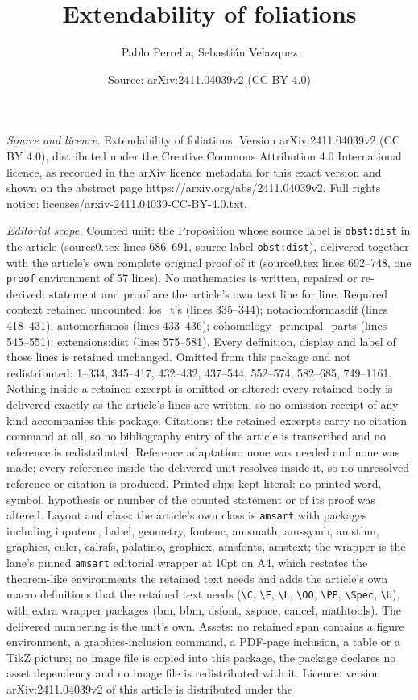 \documentclass[10pt,a4paper]{amsart}
\title[Extendability of foliations]{Extendability of foliations}
\author{Pablo Perrella, Sebasti\'an Velazquez}
\date{Source: arXiv:2411.04039v2 (CC BY 4.0)}
\begin{document}
\maketitle

\noindent\emph{Source and licence.} Extendability of foliations. Version arXiv:2411.04039v2 (CC BY 4.0), distributed under the Creative Commons Attribution 4.0 International licence, as recorded in the arXiv licence metadata for this exact version and shown on the abstract page https://arxiv.org/abs/2411.04039v2. Full rights notice: licenses/arxiv-2411.04039-CC-BY-4.0.txt.\par\smallskip

\noindent\textit{Editorial scope.} Counted unit: the Proposition whose source label is \texttt{obst:dist} in the article (source0.tex lines 686--691, source label \texttt{obst:dist}), delivered together with the article's own complete original proof of it (source0.tex lines 692--748, one \texttt{proof} environment of 57 lines). No mathematics is written, repaired or re-derived: statement and proof are the article's own text line for line. Required context retained uncounted: los\_t's (lines 335--344); notacion:formasdif (lines 418--431); automorfismos (lines 433--436); cohomology\_principal\_parts (lines 545--551); extensions:dist (lines 575--581). Every definition, display and label of those lines is retained unchanged. Omitted from this package and not redistributed: 1--334, 345--417, 432--432, 437--544, 552--574, 582--685, 749--1161. Nothing inside a retained excerpt is omitted or altered: every retained body is delivered exactly as the article's lines are written, so no omission receipt of any kind accompanies this package. Citations: the retained excerpts carry no citation command at all, so no bibliography entry of the article is transcribed and no reference is redistributed. Reference adaptation: none was needed and none was made; every reference inside the delivered unit resolves inside it, so no unresolved reference or citation is produced. Printed slips kept literal: no printed word, symbol, hypothesis or number of the counted statement or of its proof was altered. Layout and class: the article's own class is \texttt{amsart} with packages including inputenc, babel, geometry, fontenc, amsmath, amssymb, amsthm, graphics, euler, calrsfs, palatino, graphicx, amsfonts, amstext; the wrapper is the lane's pinned \texttt{amsart} editorial wrapper at 10pt on A4, which restates the theorem-like environments the retained text needs and adds the article's own macro definitions that the retained text needs (\texttt{\textbackslash C}, \texttt{\textbackslash F}, \texttt{\textbackslash L}, \texttt{\textbackslash OO}, \texttt{\textbackslash PP}, \texttt{\textbackslash Spec}, \texttt{\textbackslash U}), with extra wrapper packages (bm, bbm, dsfont, xspace, cancel, mathtools). The delivered numbering is the unit's own. Assets: no retained span contains a figure environment, a graphics-inclusion command, a PDF-page inclusion, a table or a TikZ picture; no image file is copied into this package, the package declares no asset dependency and no image file is redistributed with it. Licence: version arXiv:2411.04039v2 of this article is distributed under the 
\end{document}
